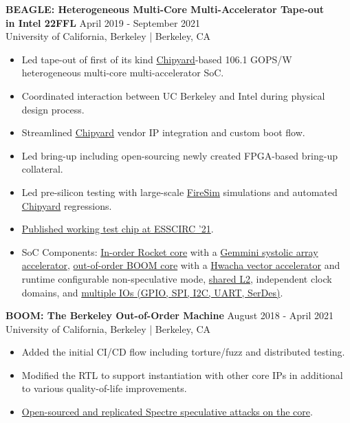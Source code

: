 \documentclass[line]{res}
\begin{document}
\begin{resume}
\label{sec:beagle}
\textbf{BEAGLE: Heterogeneous Multi-Core Multi-Accelerator Tape-out\\in Intel 22FFL} \hfill April 2019 - September 2021
\\
University of California, Berkeley | Berkeley, CA
\\
\vspace{-3mm}
\begin{itemize}
\item Led tape-out of first of its kind \hyperref[sec:chipyard]{Chipyard}-based 106.1 GOPS/W heterogeneous multi-core multi-accelerator SoC.
\item Coordinated interaction between UC Berkeley and Intel during physical design process.
\item Streamlined \hyperref[sec:chipyard]{Chipyard} vendor IP integration and custom boot flow.
\item Led bring-up including open-sourcing newly created FPGA-based bring-up collateral.
\item Led pre-silicon testing with large-scale \hyperref[sec:firesim]{FireSim} simulations and automated \hyperref[sec:chipyard]{Chipyard} regressions.
\item \hyperref[sec:beaglepaper]{Published working test chip at ESSCIRC '21}.
\item SoC Components: \href{https://www2.eecs.berkeley.edu/Pubs/TechRpts/2016/EECS-2016-17.pdf}{In-order Rocket core} with a \href{https://dl.acm.org/doi/10.1109/DAC18074.2021.9586216}{Gemmini systolic array accelerator}, \hyperref[sec:boom]{out-of-order BOOM core} with a \href{https://people.eecs.berkeley.edu/~krste/papers/EECS-2015-263.pdf}{Hwacha vector accelerator} and runtime configurable non-speculative mode, \href{https://github.com/chipsalliance/rocket-chip-inclusive-cache}{shared L2}, independent clock domains, and \href{https://github.com/chipsalliance/rocket-chip-blocks}{multiple IOs (GPIO, SPI, I2C, UART, SerDes)}.
\end{itemize}

\label{sec:boom}
\textbf{BOOM: The Berkeley Out-of-Order Machine} \hfill August 2018 - April 2021
\\
University of California, Berkeley | Berkeley, CA
\\
\vspace{-3mm}
\begin{itemize}
\item Added the initial CI/CD flow including torture/fuzz and distributed testing.
\item Modified the RTL to support instantiation with other core IPs in additional to various quality-of-life improvements.
\item \hyperref[sec:spectrerepl]{Open-sourced and replicated Spectre speculative attacks on the core}.
\end{itemize}


\end{resume}
\end{document}

